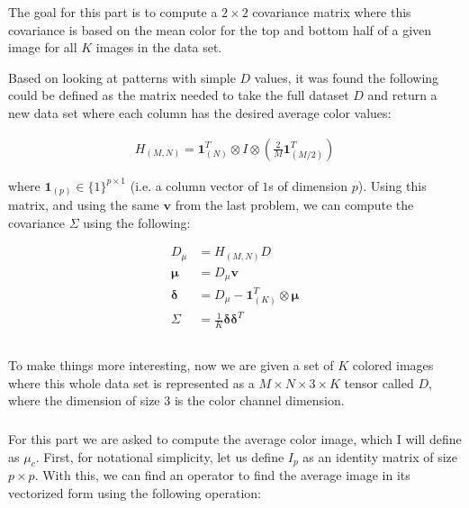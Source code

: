 \documentclass{article}[12pt]
\begin{document}
	\subsubsection{}
	The goal for this part is to compute a $2 \times 2$ covariance matrix where this covariance is based on the mean color for the top and bottom half of a given image for all $K$ images in the data set. 
	
	Based on looking at patterns with simple $D$ values, it was found the following could be defined as the matrix needed to take the full dataset $D$ and return a new data set where each column has the desired average color values:
	
	\begin{align*}
	H_{(M,N)} = \boldsymbol{1}_{(N)}^{T} \otimes I \otimes \left( \frac{2}{M} \boldsymbol{1}_{(M/2)}^{T}\right)
	\end{align*}
	
	where $\boldsymbol{1}_{(p)} \in \{1 \}^{p \times 1}$ (i.e. a column vector of $1$s of dimension $p$). Using this matrix, and using the same $\boldsymbol{v}$ from the last problem, we can compute the covariance $\Sigma$ using the following:
	
	\begin{align*}
	D_{\mu} &= H_{(M,N)}D \\
	\boldsymbol{\mu} &= D_{\mu} \boldsymbol{v} \\
	\boldsymbol{\delta} &= D_{\mu} - \boldsymbol{1}_{(K)}^{T} \otimes \boldsymbol{\mu} \\
	\Sigma &= \frac{1}{K} \boldsymbol{\delta} \boldsymbol{\delta}^{T}
	\end{align*}
	
	\subsection{}
	To make things more interesting, now we are given a set of $K$ colored images where this whole data set is represented as a $M \times N \times 3 \times K$ tensor called $D$, where the dimension of size 3 is the color channel dimension.
	
	\subsubsection{}
	For this part we are asked to compute the average color image, which I will define as $\mu_c$. First, for notational simplicity, let us define $I_p$ as an identity matrix of size $p \times p$. With this, we can find an operator to find the average image in its vectorized form using the following operation:
	
\end{document}
